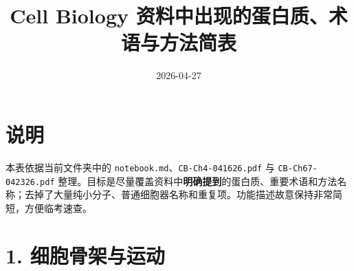 \documentclass[11pt,fontset=none]{ctexart}
\title{Cell Biology 资料中出现的蛋白质、术语与方法简表}
\author{}
\date{2026-04-27}
\begin{document}
\maketitle

\section*{说明}
本表依据当前文件夹中的 \texttt{notebook.md}、\texttt{CB-Ch4-041626.pdf} 与 \texttt{CB-Ch67-042326.pdf} 整理。目标是尽量覆盖资料中\textbf{明确提到}的蛋白质、重要术语和方法名称；去掉了大量纯小分子、普通细胞器名称和重复项。功能描述故意保持非常简短，方便临考速查。

\small

\section*{1. 细胞骨架与运动}
\end{document}
